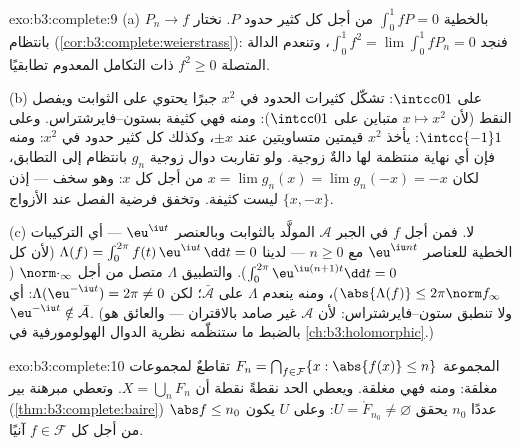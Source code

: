 \begin{solution}{exo:b3:complete:9}
(a) بالخطية $\int_0^1 fP = 0$ من أجل كل كثير حدود $P$. نختار $P_n \to f$
بانتظام (\cref{cor:b3:complete:weierstrass}): فنجد $\int_0^1 f^2 =
\lim\int_0^1 fP_n = 0$، وتنعدم الدالة المتصلة
$f^2 \geq 0$ ذات التكامل المعدوم تطابقيًا.

(b) على $\intcc01$: تشكّل كثيرات الحدود في $x^2$ جبرًا يحتوي
على الثوابت ويفصل النقط (لأن $x \mapsto x^2$ متباين على
$\intcc01$): ومنه فهي كثيفة بستون--فايرشتراس. وعلى
$\intcc{-1}1$: يأخذ $x^2$ قيمتين متساويتين عند $\pm x$، وكذلك
كل كثير حدود في $x^2$: ومنه فإن أي نهاية منتظمة لها دالةٌ
زوجية. ولو تقاربت دوال زوجية $g_n$ بانتظام إلى التطابق، لكان
$x = \lim g_n(x) = \lim g_n(-x) = -x$ من أجل كل $x$: وهو سخف --- إذن ليست كثيفة. وتخفق فرضية
الفصل عند الأزواج $\{x, -x\}$.

(c) لا. فمن أجل $f$ في الجبر $\mathcal A$ المولَّد بالثوابت
وبالعنصر $\eu^{\iu t}$ --- أي التركيبات الخطية للعناصر
$\eu^{\iu nt}$ مع $n \geq 0$ --- لدينا $\Lambda(f) =
\int_0^{2\pi}f(t)\,\eu^{\iu t}\,\dd t = 0$ (لأن كل $\int_0^{2\pi}\eu^{\iu(n+1)t}\dd t = 0$).
والتطبيق $\Lambda$ متصل من أجل $\norm\cdot_\infty$ ($\abs{\Lambda(f)}\leq
2\pi\norm f_\infty$)، ومنه ينعدم
$\Lambda$ على $\bar{\mathcal
A}$؛ لكن $\Lambda(\eu^{-\iu t}) = 2\pi \neq 0$: أي $\eu^{-\iu t}
\notin \bar{\mathcal A}$.
(ولا تنطبق ستون--فايرشتراس: لأن $\mathcal A$ غير صامد بالاقتران
--- والعائق هو بالضبط ما ستنظّمه نظرية الدوال الهولومورفية في
\cref{ch:b3:holomorphic}.)
\end{solution}

\begin{solution}{exo:b3:complete:10}
المجموعة $F_n = \bigcap_{f \in \mathcal F}\{x : \abs{f(x)} \leq n\}$ تقاطعٌ لمجموعات مغلقة: ومنه فهي مغلقة. ويعطي
الحد نقطةً نقطة أن $X = \bigcup_n F_n$. وتعطي مبرهنة بير (\cref{thm:b3:complete:baire})
عددًا $n_0$ يحقق $U = \mathring F_{n_0} \neq \varnothing$: وعلى $U$ يكون $\abs f \leq n_0$ من أجل كل
$f \in \mathcal F$ آنيًا.
\end{solution}

